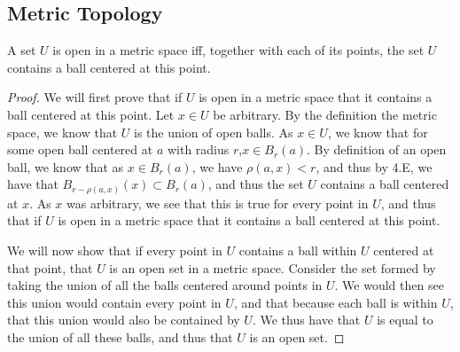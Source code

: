 \subsection{Metric Topology}

\begin{majorEx}%

\end{majorEx}

\begin{majorEx}%

\end{majorEx}

\begin{majorEx}%
  A set $U$ is open in a metric space iff, together
  with each of its points, the set $U$ contains a
  ball centered at this point.
\end{majorEx}

\begin{proof}
  We will first prove that if $U$ is open in a metric space that it
  contains a ball centered at this point. Let $x \in U$ be arbitrary.
  By the definition the metric space, we know that $U$
  is the union of open balls. As $x \in U$, we know that for some open
  ball centered at $a$ with radius $r$,$x \in B_r(a)$. By definition
  of an open ball, we know that as $x \in B_r(a)$, we have
  $\rho(a,x)<r$, and thus by 4.E, we have that
  $B_{r-\rho(a,x)}(x)\subset B_r(a)$, and thus  the set $U$ contains a
  ball centered at $x$. As $x$ was arbitrary, we see that this is true
  for every point in $U$, and thus that if $U$ is open in a metric space that it
  contains a ball centered at this point.

  We will now show that if every point in $U$ contains a ball within $U$ centered
  at that point, that $U$ is an open set in a metric space. Consider
  the set formed by taking the union of all the balls centered around
  points in $U$. We would then see this union would contain every
  point in $U$, and that because each ball is within $U$, that this
  union would also be contained by $U$. We thus have that $U$ is equal
  to the union of all these balls, and thus that $U$ is an open set.
\end{proof}